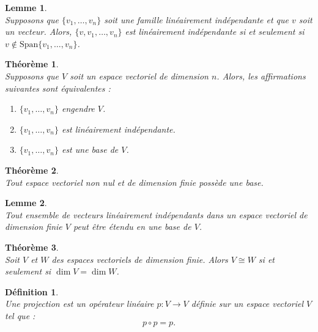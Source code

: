 \documentclass[a4paper, 14pt]{report}
\newtheorem{definition}{Définition}[section]
\newtheorem{theorem}{Théorème}[section]
\newtheorem{lemma}{Lemme}
\begin{document}
\begin{onehalfspace}
{			\begin{lemma} \cite{lang2012algebra} \\
				Supposons que \( \{v_1, \dots, v_n\} \) soit une famille linéairement indépendante et que \( v \) soit un vecteur. Alors, \( \{v, v_1, \dots, v_n\} \) est linéairement indépendante si et seulement si \( v \notin \mathrm{Span}\{v_1, \dots, v_n\} \).
			\end{lemma}
			
			
			\begin{theorem} \cite{lang2012algebra} \\
				Supposons que \( V \) soit un espace vectoriel de dimension \( n \). Alors, les affirmations suivantes sont équivalentes :
				\begin{enumerate}[label=(\alph*)]
					\item \( \{v_1, \ldots, v_n\} \) engendre \( V \).
					\item \( \{v_1, \ldots, v_n\} \) est linéairement indépendante.
					\item \( \{v_1, \ldots, v_n\} \) est une base de \( V \).
				\end{enumerate}
			\end{theorem}
			
			
			\begin{theorem} \cite{lang2012algebra} \\
				Tout espace vectoriel non nul et de dimension finie possède une base.
			\end{theorem}
			
			\begin{lemma} \cite{lang2012algebra} \\
				Tout ensemble de vecteurs linéairement indépendants dans un espace vectoriel de dimension finie \( V \) peut être étendu en une base de \( V \).
			\end{lemma}
			
			\begin{theorem} \cite{lang2012algebra} \\
				Soit \( V \) et \( W \) des espaces vectoriels de dimension finie. Alors \( V \cong W \) si et seulement si \( \dim V = \dim W \).
			\end{theorem}
			
			
			\begin{definition} \cite{lang2012algebra}\\
				Une projection est un opérateur linéaire \( p : V \to V \) définie sur un espace vectoriel \( V \) tel que :
				\[
				p \circ p = p.
				\]
			\end{definition}
			
}
\end{onehalfspace}
\end{document}

